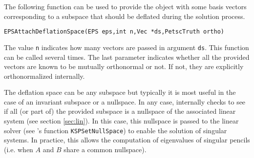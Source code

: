 	The following function can be used to provide the  object with some basis vectors corresponding to a subspace that should be deflated during the solution process. 
	\begin{Verbatim}[fontsize=\small]
	EPSAttachDeflationSpace(EPS eps,int n,Vec *ds,PetscTruth ortho)
	\end{Verbatim}
The value \texttt{n} indicates how many vectors are passed in argument \texttt{ds}. This function can be called several times. The last parameter indicates whether all the provided vectors are known to be mutually orthonormal or not. If not, they are explicitly orthonormalized internally.

	The deflation space can be any subspace but typically it is most useful in the case of an invariant subspace or a nullspace. In any case, \slepc internally checks to see if all (or part of) the provided subspace is a nullspace of the associated linear system (see section \ref{sec:lin}). In this case, this nullspace is passed to the linear solver (see \petsc's function \texttt{KSPSetNullSpace}) to enable the solution of singular systems. In practice, this allows the computation of eigenvalues of singular pencils (i.e. when $A$ and $B$ share a common nullspace).

